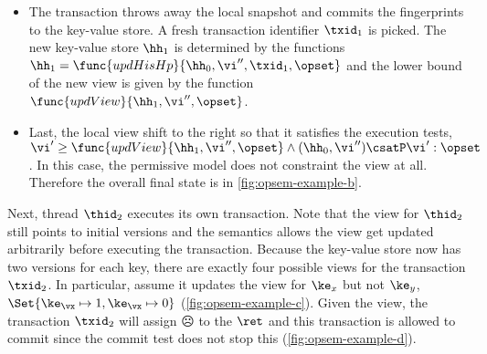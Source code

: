 \begin{itemize}
\item 
The transaction throws away the local snapshot and commits the fingerprints to the key-value store.
A fresh transaction identifier \( \txid_{1} \) is picked.
The new key-value store \( \hh_{1} \) is determined by the functions $\hh_{1} = \func{updHisHp}{\hh_0, \vi'',\txid_1, \opset}$ and the lower bound of the new view is given by the function \( \func{updView}{\hh_1, \vi'' ,\opset}\).
\item Last, the local view shift to the right so that it satisfies the execution tests, \( \vi' \geq \func{updView}{\hh_1, \vi'' ,\opset} \land (\hh_{0}, \vi'') \csatP \vi' : \opset \).
In this case, the permissive model does not constraint the view at all.
Therefore the overall final state is in \cref{fig:opsem-example-b}.
\end{itemize}

Next, thread $\thid_2$ executes its own transaction.
Note that the view for \( \thid_2\) still points to initial versions and the semantics allows the view get updated arbitrarily before executing the transaction.
Because the key-value store now has two versions for each key, there are exactly four possible views for the transaction \( \txid_{2} \).
In particular, assume it updates the view for \( \ke_{x} \) but not \( \ke_y \), \ie \( \Set{\ke_\vx \mapsto 1, \ke_\vx \mapsto 0} \) (\cref{fig:opsem-example-c}).
Given the view, the transaction \( \txid_{2} \) will assign \(\sadface\) to the \( \ret\) and this transaction is allowed to commit since the commit test does not stop this (\cref{fig:opsem-example-d}).

